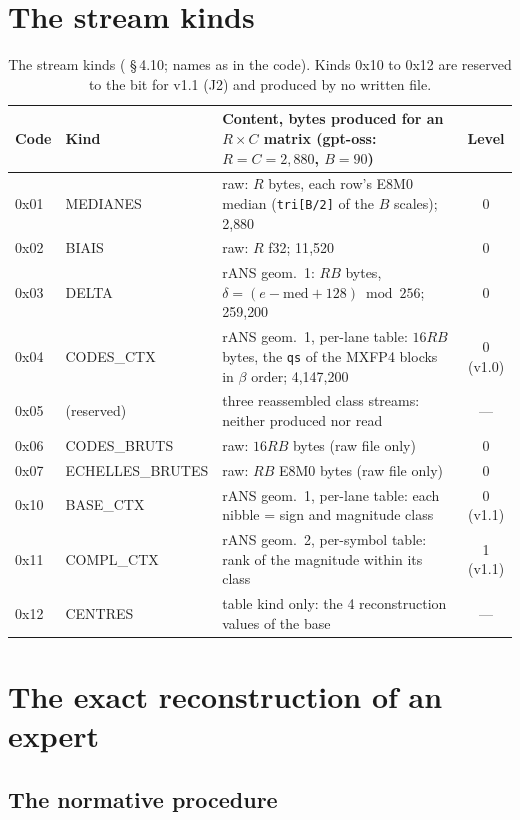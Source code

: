 \section{The stream kinds}\label{t2fmt:sec:sortes}

\begin{table}[ht]
\centering\small
\begin{tabularx}{\linewidth}{l l >{\raggedright\arraybackslash}X c}
\toprule
Code & Kind & Content, bytes produced for an $R \times C$ matrix (gpt-oss: $R = C = 2{,}880$, $B = 90$) & Level \\
\midrule
0x01 & MEDIANES & raw: $R$ bytes, each row's E8M0 median (\texttt{tri[B/2]} of the $B$ scales); 2{,}880 & 0 \\
0x02 & BIAIS & raw: $R$ f32; 11{,}520 & 0 \\
0x03 & DELTA & rANS geom.\ 1: $RB$ bytes, $\delta = (e - \text{med} + 128) \bmod 256$; 259{,}200 & 0 \\
0x04 & CODES\_CTX & rANS geom.\ 1, per-lane table: $16RB$ bytes, the \texttt{qs} of the MXFP4 blocks in $\beta$ order; 4{,}147{,}200 & 0 (v1.0) \\
0x05 & (reserved) & three reassembled class streams: neither produced nor read & — \\
0x06 & CODES\_BRUTS & raw: $16RB$ bytes (raw file only) & 0 \\
0x07 & ECHELLES\_BRUTES & raw: $RB$ E8M0 bytes (raw file only) & 0 \\
0x10 & BASE\_CTX & rANS geom.\ 1, per-lane table: each nibble = sign and magnitude class & 0 (v1.1) \\
0x11 & COMPL\_CTX & rANS geom.\ 2, per-symbol table: rank of the magnitude within its class & 1 (v1.1) \\
0x12 & CENTRES & table kind only: the 4 reconstruction values of the base & — \\
\bottomrule
\end{tabularx}
\caption[The stream kinds]{The stream kinds ( §\,4.10; names as in the code). Kinds 0x10 to 0x12 are reserved to the bit for v1.1 (J2) and produced by no written file.}
\label{t2fmt:tab:sortes}
\end{table}

\section{The exact reconstruction of an expert}\label{t2fmt:sec:reconstruction}

\subsection{The normative procedure}

